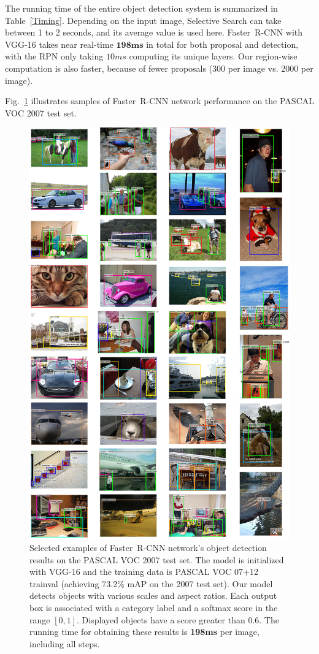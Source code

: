 \documentclass[conference]{IEEEtran}
\newcommand{\faster}[0]{\mbox{Faster~R-CNN}}
\begin{document}
The running time of the entire object detection system is summarized in Table~\ref{Timing}. Depending on the input image, Selective Search can take between 1 to 2 seconds, and its average value is used here. 
\faster{} with VGG-16 takes near real-time $\mathbf{198ms}$ in total for both proposal and detection, with the RPN only taking $10ms$ computing its unique layers. Our region-wise computation is also faster, because of fewer proposals (300 per image vs. 2000 per image).

Fig.~\ref{FasterRCNN-VOC2007} illustrates samples of \faster{} network performance on the PASCAL VOC 2007 test set.

\begin{figure}[t]
\centerline{\includegraphics[width=\linewidth]{images/FasterRCNN-VOC07-compressed.png}}
\caption{Selected examples of \faster{} network's object detection results on the PASCAL VOC 2007 test set. The model is initialized with VGG-16 and the training data is PASCAL VOC 07+12 trainval (achieving 73.2\% mAP on the 2007 test set). Our model detects objects with various scales and aspect ratios. Each output box is associated with a category label and a softmax score in the range $[0, 1]$. Displayed objects have a score greater than 0.6. The running time for obtaining these results is \textbf{198ms} per image, including all steps.}
\label{FasterRCNN-VOC2007}
\end{figure}
\end{document}
